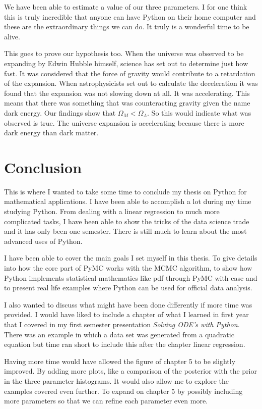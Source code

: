 \documentclass[12pt,twoside]{report}   %
\begin{document}
We have been able to estimate a value of our three parameters. I for one think this is truly incredible that anyone can have Python on their home computer and these are the extraordinary things we can do. It truly is a wonderful time to be alive.

This goes to prove our hypothesis too. When the universe was observed to be expanding by Edwin Hubble himself, science has set out to determine just how fast. It was considered that the force of gravity would contribute to a retardation of the expansion. When astrophysicists set out to calculate the deceleration it was found that the expansion was not slowing down at all. It was accelerating. This means that there was something that was counteracting gravity given the name dark energy. Our findings show that $\Omega_M < \Omega_\Lambda$. So this would indicate what was observed is true. The universe expansion is accelerating because there is more dark energy than dark matter.

\chapter{Conclusion}

This is where I wanted to take some time to conclude my thesis on Python for mathematical applications. I have been able to accomplish a lot during my time studying Python. From dealing with a linear regression to much more complicated tasks, I have been able to show the tricks of the data science trade and it has only been one semester. There is still much to learn about the most advanced uses of Python.

I have been able to cover the main goals I set myself in this thesis. To give details into how the core part of PyMC works with the MCMC algorithm, to show how Python implements statistical mathematics like pdf through PyMC with ease and to present real life examples where Python can be used for official data analysis.

I also wanted to discuss what might have been done differently if more time was provided. I would have liked to include a chapter of what I learned in first year that I covered in my first semester presentation \textit{Solving ODE's with Python}. There was an example in which a data set was generated from a quadratic equation but time ran short to include this after the chapter linear regression.

Having more time would have allowed the figure of chapter 5 to be slightly improved. By adding more plots, like a comparison of the posterior with the prior in the three parameter histograms. It would also allow me to explore the examples covered even further. To expand on chapter 5 by possibly including more parameters so that we can refine each parameter even more. 
\end{document}

